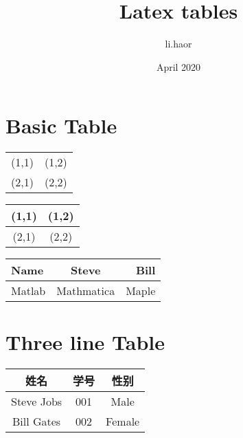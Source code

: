 \documentclass{article}
\title{Latex tables}
\author{li.haor }
\date{April 2020}
\begin{document}
\maketitle

\section{Basic Table}
\begin{tabular}{cc}%
(1,1)&(1,2)\\%
(2,1)&(2,2)\\%
\end{tabular}
\begin{tabular}{|c|c|}%
\hline  %
(1,1)&(1,2)\\
\hline  %
(2,1)&(2,2)\\
\hline %
\end{tabular}
\begin{tabular}{|l|c|r|} %
\hline 
Name&Steve&Bill\\
\hline  
Matlab&Mathmatica&Maple\\
\hline 
\end{tabular}
\section{Three line Table}
\begin{tabular}{ccc}
\hline
姓名& 学号& 性别\\
\hline
Steve Jobs& 001& Male\\
Bill Gates& 002& Female\\
\hline
\end{tabular}
\end{document}
